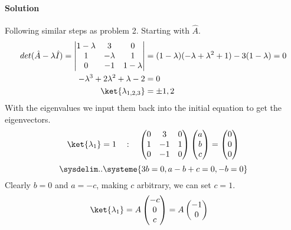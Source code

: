 \documentclass{article}
\begin{document}
\begin{enumerate}
		\paragraph{Solution} Following similar steps as problem 2. Starting with $\hat{A}$.
		\begin{align*}
			det(\hat{A} - \lambda\hat{I}) = \begin{vmatrix}
				1 - \lambda & 3 & 0 \\
				1 & -\lambda & 1 \\
				0 & -1 & 1 - \lambda
			\end{vmatrix}
			&= (1 - \lambda) (-\lambda + \lambda^2 + 1) - 3(1 - \lambda) = 0 \\
			-\lambda^3 + 2\lambda^2 + \lambda - 2 &= 0 \\
			\ket{\lambda_{1,2,3}} &= \pm 1, 2
		\end{align*}
		With the eigenvalues we input them back into the initial equation to get the eigenvectors.
		\begin{align*}
			\ket{\lambda_1} = 1 \quad : \quad
			\begin{pmatrix}
				0 & 3 & 0 \\
				1 & -1 & 1 \\
				0 & -1 & 0
			\end{pmatrix}
			\begin{pmatrix}
				a \\
				b \\
				c
			\end{pmatrix}
			= \begin{pmatrix}
				0 \\
				0 \\
				0
			\end{pmatrix}
		\end{align*}
		\begin{equation*}
			\sysdelim..\systeme{
				3b = 0,
				a - b + c = 0,
				-b = 0
			}
		\end{equation*}
		Clearly $b=0$ and $a = -c$, making $c$ arbitrary, we can set $c=1$.
		\begin{equation*}
			\begin{split}
				\ket{\lambda_1} &= A \begin{pmatrix}
					-c \\
					0 \\
					c
				\end{pmatrix}
				= A \begin{pmatrix}
					-1 \\
					0 \\

\end{pmatrix}
\end{split}
\end{equation*}
\end{enumerate}
\end{document}
